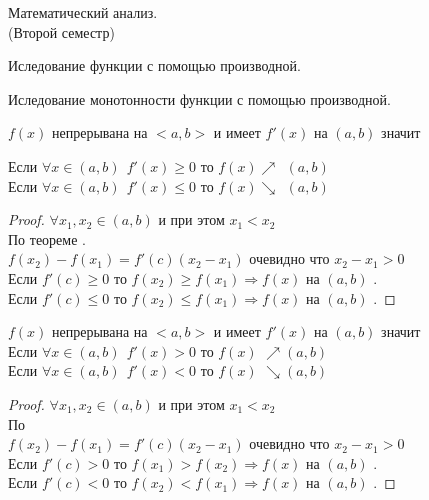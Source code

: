\begin{title}
  Математический анализ.\\
  (Второй семестр)
\end{title}

\begin{title}
  Иследование функции с помощью производной.
\end{title}

\begin{title}[\Large]
  Иследование монотонности функции с помощью производной.
\end{title}

\begin{theorem}
  $f(x)$ непрерывана на $<a,b>$ и имеет $f'(x)$ на $(a,b)$ значит

  Если $\forall x \in (a,b) ~~ f'(x) \ge 0 $ то $f(x) \nearrow ~~ (a,b)$\\
  Если $\forall x \in (a,b) ~~ f'(x) \le 0 $ то $f(x) \searrow ~~ (a,b)$
\end{theorem}

\begin{proof}
  $\forall x_1, x_2 \in (a,b)$ и при этом $x_1 < x_2 $\\
  По теореме .\\
  $f(x_2) - f(x_1) = f'(c)(x_2 - x_1)$ очевидно что $x_2 - x_1 > 0 $\\
  Если $f'(c) \ge 0$ то $f(x_2) \ge f(x_1) \Rightarrow f(x)$ на $(a,b)$
  .\\
  Если $f'(c) \le 0$ то $f(x_2) \le f(x_1) \Rightarrow f(x)$ на $(a,b)$
  .
\end{proof}

\begin{theorem}
  $f(x)$ непрерывана на $<a,b>$ и имеет $f'(x)$ на $(a,b)$ значит\\
  Если $\forall x \in (a, b) ~~ f'(x) > 0$ то $f(x)$ 
  $\nearrow (a, b)$\\
  Если $\forall x \in (a, b) ~~ f'(x) < 0$ то $f(x)$ 
  $\searrow (a, b)$
\end{theorem}

\begin{proof}
  $\forall x_1, x_2 \in (a,b)$ и при этом $x_1 < x_2 $\\
  По \\
  $f(x_2) - f(x_1) = f'(c)(x_2 - x_1)$ очевидно что $x_2 - x_1 > 0$\\
  Если $f'(c) > 0$ то $f(x_1) > f(x_2) \Rightarrow f(x)$ на $(a,b)$
  .\\
  Если $f'(c) < 0$ то $f(x_2) < f(x_1) \Rightarrow f(x)$ на $(a,b)$
  .
\end{proof}

